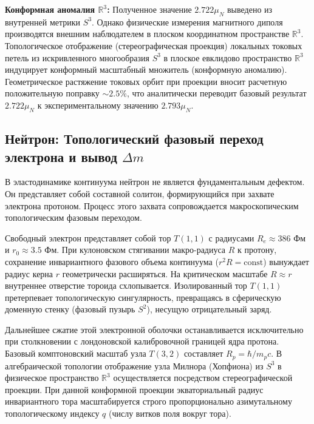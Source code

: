 \documentclass[11pt,a4paper]{article}
\begin{document}
	\textbf{Конформная аномалия $\mathbb{R}^3$:}
	Полученное значение $2.722 \mu_N$ выведено из внутренней метрики $S^3$. Однако физические измерения магнитного диполя производятся внешним наблюдателем в плоском координатном пространстве $\mathbb{R}^3$. Топологическое отображение (стереографическая проекция) локальных токовых петель из искривленного многообразия $S^3$ в плоское евклидово пространство $\mathbb{R}^3$ индуцирует конформный масштабный множитель (конформную аномалию). 
	Геометрическое растяжение токовых орбит при проекции вносит расчетную положительную поправку $\sim 2.5\%$, что аналитически переводит базовый результат $2.722 \mu_N$ к экспериментальному значению $2.793 \mu_N$.
	
	\subsection{Нейтрон: Топологический фазовый переход электрона и вывод $\Delta m$}
	В эластодинамике континуума нейтрон не является фундаментальным дефектом. Он представляет собой составной солитон, формирующийся при захвате электрона протоном. Процесс этого захвата сопровождается макроскопическим топологическим фазовым переходом.
	
	Свободный электрон представляет собой тор $T(1,1)$ с радиусами $R_e \approx 386$ Фм и $r_0 \approx 3.5$ Фм. При кулоновском стягивании макро-радиуса $R$ к протону, сохранение инвариантного фазового объема континуума ($r^2 R = \text{const}$) вынуждает радиус керна $r$ геометрически расширяться. 
	На критическом масштабе $R \approx r$ внутреннее отверстие тороида схлопывается. Изолированный тор $T(1,1)$ претерпевает топологическую сингулярность, превращаясь в сферическую доменную стенку (фазовый пузырь $S^2$), несущую отрицательный заряд.
	
	Дальнейшее сжатие этой электронной оболочки останавливается исключительно при столкновении с лондоновской калибровочной границей ядра протона. Базовый комптоновский масштаб узла $T(3,2)$ составляет $R_p = \hbar / m_p c$. 
	В алгебраической топологии отображение узла Милнора (Хопфиона) из $S^3$ в физическое пространство $\mathbb{R}^3$ осуществляется посредством стереографической проекции. При данной конформной проекции экваториальный радиус инвариантного тора масштабируется строго пропорционально азимутальному топологическому индексу $q$ (числу витков поля вокруг тора). 
	
\end{document}

